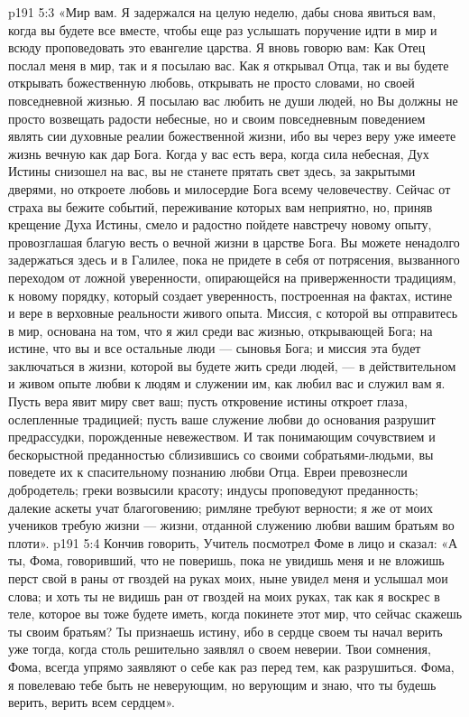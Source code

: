 \vs p191 5:3 «Мир вам. Я задержался на целую неделю, дабы снова явиться вам, когда вы будете все вместе, чтобы еще раз услышать поручение идти в мир и всюду проповедовать это евангелие царства. Я вновь говорю вам: Как Отец послал меня в мир, так и я посылаю вас. Как я открывал Отца, так и вы будете открывать божественную любовь, открывать не просто словами, но своей повседневной жизнью. Я посылаю вас любить не души людей, но  Вы должны не просто возвещать радости небесные, но и своим повседневным поведением являть сии духовные реалии божественной жизни, ибо вы через веру уже имеете жизнь вечную как дар Бога. Когда у вас есть вера, когда сила небесная, Дух Истины снизошел на вас, вы не станете прятать свет здесь, за закрытыми дверями, но откроете любовь и милосердие Бога всему человечеству. Сейчас от страха вы бежите событий, переживание которых вам неприятно, но, приняв крещение Духа Истины, смело и радостно пойдете навстречу новому опыту, провозглашая благую весть о вечной жизни в царстве Бога. Вы можете ненадолго задержаться здесь и в Галилее, пока не придете в себя от потрясения, вызванного переходом от ложной уверенности, опирающейся на приверженности традициям, к новому порядку, который создает уверенность, построенная на фактах, истине и вере в верховные реальности живого опыта. Миссия, с которой вы отправитесь в мир, основана на том, что я жил среди вас жизнью, открывающей Бога; на истине, что вы и все остальные люди --- сыновья Бога; и миссия эта будет заключаться в жизни, которой вы будете жить среди людей, --- в действительном и живом опыте любви к людям и служении им, как любил вас и служил вам я. Пусть вера явит миру свет ваш; пусть откровение истины откроет глаза, ослепленные традицией; пусть ваше служение любви до основания разрушит предрассудки, порожденные невежеством. И так понимающим сочувствием и бескорыстной преданностью сблизившись со своими собратьями\hyp{}людьми, вы поведете их к спасительному познанию любви Отца. Евреи превознесли добродетель; греки возвысили красоту; индусы проповедуют преданность; далекие аскеты учат благоговению; римляне требуют верности; я же от моих учеников требую жизни --- жизни, отданной служению любви вашим братьям во плоти».
\vs p191 5:4 Кончив говорить, Учитель посмотрел Фоме в лицо и сказал: «А ты, Фома, говоривший, что не поверишь, пока не увидишь меня и не вложишь перст свой в раны от гвоздей на руках моих, ныне увидел меня и услышал мои слова; и хоть ты не видишь ран от гвоздей на моих руках, так как я воскрес в теле, которое вы тоже будете иметь, когда покинете этот мир, что сейчас скажешь ты своим братьям? Ты признаешь истину, ибо в сердце своем ты начал верить уже тогда, когда столь решительно заявлял о своем неверии. Твои сомнения, Фома, всегда упрямо заявляют о себе как раз перед тем, как разрушиться. Фома, я повелеваю тебе быть не неверующим, но верующим и знаю, что ты будешь верить, верить всем сердцем».
